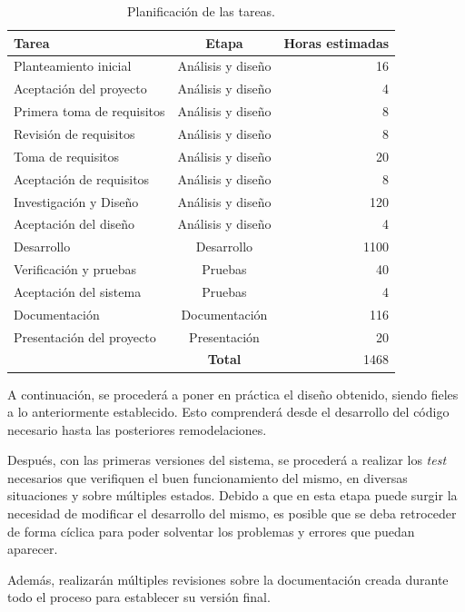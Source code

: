 \begin{table}[H]
\begin{center}
\begin{tabular}{|| l | c | r ||}
	\hline
	\hline
	Tarea & Etapa & Horas estimadas\\
	\hline
	\hline
	Planteamiento inicial & Análisis y diseño & 16\\
	Aceptación del proyecto & Análisis y diseño & 4\\
	Primera toma de requisitos & Análisis y diseño & 8\\
	Revisión de requisitos & Análisis y diseño & 8\\
	Toma de requisitos & Análisis y diseño & 20\\
	Aceptación de requisitos & Análisis y diseño & 8\\
	Investigación y Diseño & Análisis y diseño & 120\\
	Aceptación del diseño & Análisis y diseño & 4\\
	Desarrollo & Desarrollo & 1100\\
	Verificación y pruebas & Pruebas & 40\\
	Aceptación del sistema & Pruebas & 4\\
	Documentación & Documentación  & 116\\
	Presentación del proyecto & Presentación & 20\\
	\hline
	& \textbf{Total} & 1468\\
	\hline
	\hline
\end{tabular}
\end{center}
	\caption[Planificación del proyecto]{Planificación de las tareas.}
	\label{tab:planificacion}
\end{table}

A continuación, se procederá a poner en práctica el diseño 
obtenido, siendo fieles a lo anteriormente establecido. Esto 
comprenderá desde el desarrollo del código necesario hasta las 
posteriores remodelaciones.

Después, con las primeras versiones del sistema, se procederá a 
realizar los \emph{test} necesarios que verifiquen el buen 
funcionamiento del mismo, en diversas situaciones y sobre múltiples 
estados. Debido a que en esta etapa puede surgir la necesidad de 
modificar el desarrollo del mismo, es posible que se deba retroceder 
de forma cíclica para poder solventar los problemas y errores que 
puedan aparecer.

Además, realizarán múltiples revisiones sobre la documentación 
creada durante todo el proceso para establecer su versión final.

